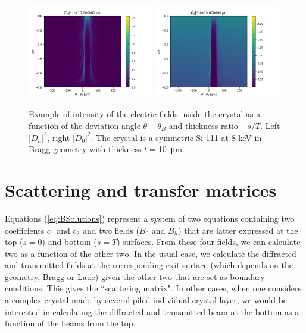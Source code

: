 \documentclass{iucr}
\newcommand{\cyan}[1]{{\color{cyan(process)}#1}}
\begin{document}
\begin{figure}\label{fig:braggMap}
    \centering
    \includegraphics[width=0.49\textwidth]{figures/Bragg_DH.png}
    \includegraphics[width=0.49\textwidth]{figures/Bragg_D0.png}
    \caption{Example of intensity of the electric fields inside the crystal as a function of the 
    deviation angle $\theta-\theta_B$ and thickness ratio $-s/T$. 
    Left $|D_h|^2$, right $|D_0|^2$. 
    The crystal is \cyan{a symmetric} Si 111 at 8 keV \cyan{in Bragg geometry} with thickness $t=$\SI{10}{\micro\meter}. 
    }
\end{figure}

\section{Scattering and transfer matrices}
\label{sec:matrices}

Equations (\ref{eq:BSolutions}) represent a system of two equations containing two coefficients $c_1$ and $c_2$ and two fields ($B_0$ and $B_h$) that are latter expressed at the top ($s=0$) and bottom ($s=T$) surfaces. From these four fields, we can calculate two as a function of the other two. In the usual case, we calculate the diffracted and transmitted fields at the corresponding exit surface (which depends on the geometry, Bragg or Laue) given the other two that are set as boundary conditions. This gives the ``scattering matrix". In other cases, when one considers a complex crystal made by several piled individual crystal layer, we would be interested in calculating the diffracted and transmitted beam at the bottom as a function of the beams from the top.   
\end{document}
